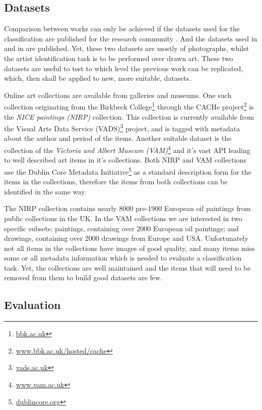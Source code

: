 \documentclass[a4paper]{article}
\begin{document}
\subsection{Datasets}

Comparison between works can only be achieved if the datasets used for the
classification are published for the research community \cite{mach10clas}.  And
the datasets used in \cite{mach10clas} and in \cite{jma12clas} are published.
Yet, these two datasets are mostly of photographs, whilst the artist
identification task is to be performed over drawn art.  These two datasets are
useful to test to which level the previous work can be replicated, which, then
shall be applied to new, more suitable, datasets.

Online art collections are available from galleries and museums.  One such
collection originating from the Birkbeck College\footnote{
\href{http://www.bbk.ac.uk}{bbk.ac.uk}} through the CACHe project\footnote{
\href{http://www.bbk.ac.uk/hosted/cache/}{www.bbk.ac.uk/hosted/cache}} is the
\emph{NICE paintings (NIRP)} collection.  This collection is currently
available from the Visual Arts Data Service (VADS)\footnote{
\href{http://vads.ac.uk/}{vads.ac.uk}} project, and is tagged with metadata
about the author and period of the items.  Another suitable dataset is the
collection of the \emph{Victoria and Albert Museum (VAM)}\footnote{
\href{http://www.vam.ac.uk/}{www.vam.ac.uk}} and it's vast API leading to well
described art items in it's collections.  Both NIRP and VAM collections use the
Dublin Core Metadata Initiative\footnote{
\href{http://dublincore.org/}{dublincore.org}} as a standard description form
for the items in the collections, therefore the items from both collections can
be identified in the same way.

The NIRP collection contains nearly 8000 pre-1900 European oil paintings from
public collections in the UK.  In the VAM collections we are interested in
two specific subsets: paintings, containing over 2000 European oil paintings;
and drawings, containing over 2000 drawings from Europe and USA.
Unfortunately not all items in the collections have images of good quality, and
many items miss some or all metadata information which is needed to evaluate a
classification task.  Yet, the collections are well maintained and the items
that will need to be removed from them to build good datasets are few.

\subsection{Evaluation}
\end{document}
